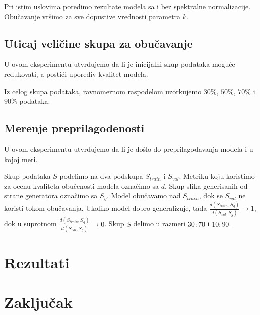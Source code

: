 \documentclass[12pt, a4paper]{article}
\begin{document}
Pri istim uslovima poredimo rezultate modela sa i bez spektralne normalizacije. Obučavanje vršimo za sve dopustive vrednosti parametra $k$.

\subsection{Uticaj veličine skupa za obučavanje}
U ovom eksperimentu utvrđujemo da li je inicijalni skup podataka moguće redukovati, a postići uporediv kvalitet modela.

Iz celog skupa podataka, ravnomernom raspodelom uzorkujemo $30\%$, $50\%$, $70\%$ i $90\%$ podataka.

\subsection{Merenje preprilagođenosti}
U ovom eksperimentu utvrđujemo da li je došlo do preprilagođavanja modela i u kojoj meri.

Skup podataka $S$ podelimo na dva podskupa $S_{train}$ i $S_{val}$. Metriku koju koristimo za ocenu kvaliteta obučenosti modela označimo sa $d$. Skup slika generisanih od strane generatora označimo sa $S_g$. Model obučavamo nad $S_{train}$, dok se $S_{val}$ ne koristi tokom obučavanja. Ukoliko model dobro generalizuje, tada $\frac{d(S_{train}, S_g)}{d(S_{val}, S_g)} \rightarrow 1$, dok u suprotnom $\frac{d(S_{train}, S_g)}{d(S_{val}, S_g)} \rightarrow 0$. Skup $S$ delimo u razmeri $30:70$ i $10:90$.

\section{Rezultati}

\section{Zaključak}
\end{document}

